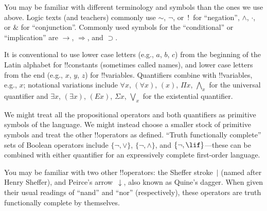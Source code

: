 \documentclass[../../../include/open-logic-section]{subfiles}
\begin{document}

\begin{intro}
You may be familiar with different terminology and symbols than the
ones we use above. Logic texts (and teachers) commonly use 
$\sim$, $\neg$, or~!\ for ``negation'', $\wedge$, $\cdot$, or $\&$
for ``conjunction''.  Commonly used symbols for the ``conditional'' or
``implication'' are $\rightarrow$, $\Rightarrow$, and $\supset$.

It is conventional to use lower case letters (e.g., $a$, $b$, $c$) from
the beginning of the Latin alphabet for !!{constant}s (sometimes called
names), and lower case letters from the end (e.g., $x$, $y$, $z$) for
!!{variable}s. Quantifiers combine with !!{variable}s, e.g., $x$;
notational variations include $\forall x$, $(\forall x)$, $(x)$, $\Pi x$,
$\bigwedge_x$ for the universal quantifier and $\exists x$, $(\exists
x)$, $(Ex)$, $\Sigma x$, $\bigvee_x$ for the existential quantifier.
\end{intro}

\begin{explain}
We might treat all the propositional operators and both quantifiers as
primitive symbols of the language.  We might instead choose a smaller
stock of primitive symbols and treat the other !!{operator}s as
defined. ``Truth functionally complete'' sets of Boolean operators
include $\{ \lnot, \lor \}$, $\{ \lnot, \land \}$, and $\{ \lnot,
\lif\}$---these can be combined with either quantifier for an
expressively complete first-order language.

You may be familiar with two other !!{operator}s: the Sheffer
stroke~$|$ (named after Henry Sheffer), and Peirce's
arrow~$\downarrow$, also known as Quine's dagger.  When given their
usual readings of ``nand'' and ``nor'' (respectively), these operators
are truth functionally complete by themselves.
\end{explain}
\end{document}

